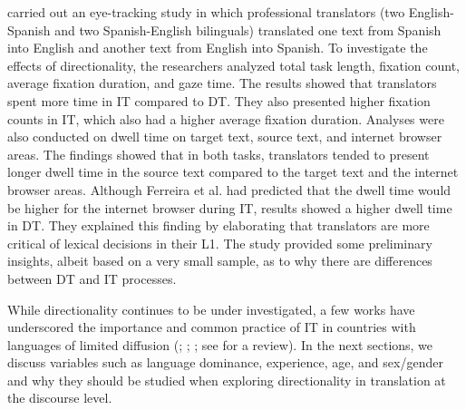 \documentclass[output=paper]{langscibook}
\begin{document}
\citet{ferreira2016cognitive} carried out an eye-tracking study in which professional translators (two English-Spanish and two Spanish-English bilinguals) translated one text from Spanish into English and another text from English into Spanish. To investigate the effects of directionality, the researchers analyzed total task length, fixation count, average fixation duration, and gaze time. The results showed that translators spent more time in IT compared to DT. They also presented higher fixation counts in IT, which also had a higher average fixation duration. Analyses were also conducted on dwell time on target text, source text, and internet browser areas. The findings showed that in both tasks, translators tended to present longer dwell time in the source text compared to the target text and the internet browser areas. Although Ferreira et al. had predicted that the dwell time would be higher for the internet browser during IT, results showed a higher dwell time in DT. They explained this finding by elaborating that translators are more critical of lexical decisions in their L1. The study provided some preliminary insights, albeit based on a very small sample, as to why there are differences between DT and IT processes.

While directionality continues to be under investigated, a few works have underscored the importance and common practice of IT in countries with languages of limited diffusion (\citealt{pavlovic2010were}; \citealt{ferreira2013direcionalidade}; \citealt{whyatt2018old}; see \citealt{ferreira2017directionality} for a review). In the next sections, we discuss variables such as language dominance, experience, age, and sex/gender and why they should be studied when exploring directionality in translation at the discourse level. 
\end{document}
